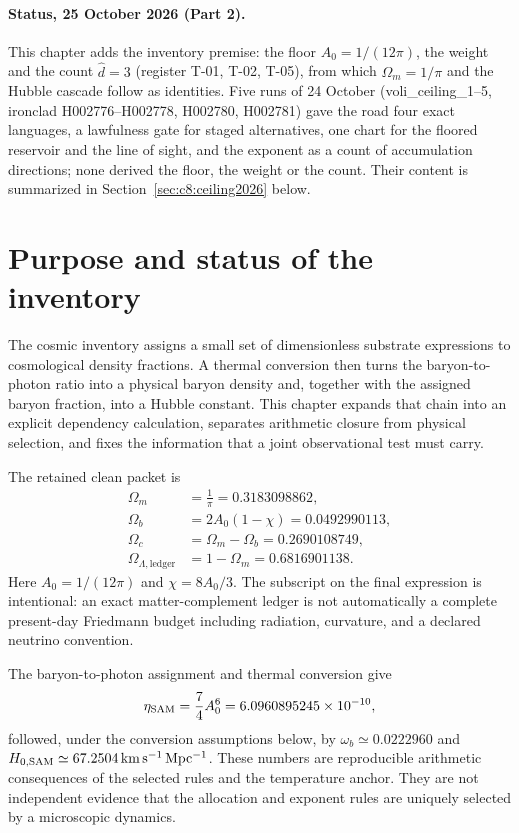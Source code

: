 

\paragraph*{Status, 25 October 2026 (Part 2).} This chapter adds the inventory premise: the floor $A_0=1/(12\pi)$, the weight and the count $\hat d=3$ (register T-01, T-02, T-05), from which $\Omega_m=1/\pi$ and the Hubble cascade follow as identities. Five runs of 24 October (voli\_ceiling\_1--5, ironclad H002776--H002778, H002780, H002781) gave the road four exact languages, a lawfulness gate for staged alternatives, one chart for the floored reservoir and the line of sight, and the exponent as a count of accumulation directions; none derived the floor, the weight or the count. Their content is summarized in Section~\ref{sec:c8:ceiling2026} below.


\section{Purpose and status of the inventory}
The cosmic inventory assigns a small set of dimensionless substrate expressions to cosmological density fractions. A thermal conversion then turns the baryon-to-photon ratio into a physical baryon density and, together with the assigned baryon fraction, into a Hubble constant. This chapter expands that chain into an explicit dependency calculation, separates arithmetic closure from physical selection, and fixes the information that a joint observational test must carry.

The retained clean packet is
\begin{align}
 \Omega_m&=\frac1\pi=0.3183098862,\label{c8:om}\\
 \Omega_b&=2A_0(1-\chi)=0.0492990113,\label{c8:ob}\\
 \Omega_c&=\Omega_m-\Omega_b=0.2690108749,\label{c8:oc}\\
 \Omega_{\Lambda,\mathrm{ledger}}&=1-\Omega_m=0.6816901138.
 \label{c8:ol}
\end{align}
Here $A_0=1/(12\pi)$ and $\chi=8A_0/3$. The subscript on the final expression is intentional: an exact matter-complement ledger is not automatically a complete present-day Friedmann budget including radiation, curvature, and a declared neutrino convention.

The baryon-to-photon assignment and thermal conversion give
\begin{equation}
 \eta_{\rm SAM}=\frac74A_0^6=6.0960895245\times10^{-10},
 \label{c8:eta}
\end{equation}
followed, under the conversion assumptions below, by $\omega_b\simeq0.0222960$ and $H_{0,\rm SAM}\simeq67.2504\,\mathrm{km\,s^{-1}\,Mpc^{-1}}$. These numbers are reproducible arithmetic consequences of the selected rules and the temperature anchor. They are not independent evidence that the allocation and exponent rules are uniquely selected by a microscopic dynamics.

